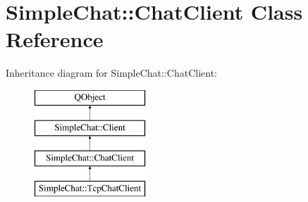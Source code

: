 \hypertarget{classSimpleChat_1_1ChatClient}{\section{Simple\-Chat\-:\-:Chat\-Client Class Reference}
\label{classSimpleChat_1_1ChatClient}
}
Inheritance diagram for Simple\-Chat\-:\-:Chat\-Client\-:\begin{figure}[H]
\begin{center}
\leavevmode
\includegraphics[height=4.000000cm]{classSimpleChat_1_1ChatClient}
\end{center}
\end{figure}
